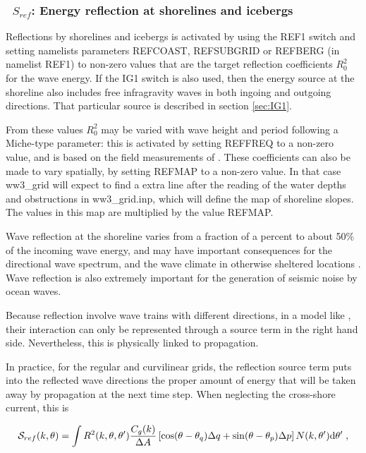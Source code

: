 \vsssub
\subsubsection{~$S_{ref}$: Energy reflection at shorelines and icebergs} \label{sec:REF1}
\vsssub


\noindent 
Reflections by shorelines and icebergs is activated by using the {\code REF1}
switch and setting namelists parameters {\code REFCOAST}, {\code REFSUBGRID}
or {\code REFBERG} (in namelist {\F REF1}) to non-zero values that are the
target reflection coefficients $R_0^2$ for the wave energy.  If the {\code
IG1} switch is also used, then the energy source at the shoreline also
includes free infragravity waves in both ingoing and outgoing directions.
That particular source is described in section
\ref{sec:IG1}.

From these values $R_0^2$ may be varied with wave height and period following
a Miche-type parameter: this is activated by setting {\code REFFREQ} to a
non-zero value, and is based on the field measurements of \cite{art:EHG94}.
These coefficients can also be made to vary spatially, by setting {\code
REFMAP} to a non-zero value. In that case ww3\_grid will expect to find a
extra line after the reading of the water depths and obstructions in
ww3\_grid.inp, which will define the map of shoreline slopes. The values in this map 
are multiplied by the value {\code REFMAP}.

Wave reflection at the shoreline varies from a fraction of a percent to about
50\% of the incoming wave energy, and may have important consequences for the
directional wave spectrum, and the wave climate in otherwise sheltered
locations \citep{pro:ORe99}. Wave reflection is also extremely important for
the generation of seismic noise by ocean waves.

Because reflection involve wave trains with different directions, in a model
like \ws, their interaction can only be represented through a source term in
the right hand side. Nevertheless, this is physically linked to propagation.

In practice, for the regular and curvilinear grids, the reflection source term
puts into the reflected wave directions the proper amount of energy that will
be taken away by propagation at the next time step. When neglecting the
cross-shore current, this is

\begin{equation} 
{\cal S}_{ref}(k,\theta) = 
\int R^2(k,\theta,\theta') \frac{C_g(k)}{\Delta A} \left[\cos (\theta-\theta_q) \Delta q + \sin (\theta-\theta_p)  \Delta p \right] N(k,\theta') \mathrm{d} \theta' \; ,
\end{equation}

